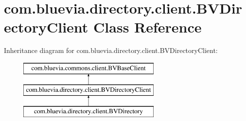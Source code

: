 \hypertarget{classcom_1_1bluevia_1_1directory_1_1client_1_1BVDirectoryClient}{
\section{com.bluevia.directory.client.BVDirectoryClient Class Reference}
\label{classcom_1_1bluevia_1_1directory_1_1client_1_1BVDirectoryClient}
}
Inheritance diagram for com.bluevia.directory.client.BVDirectoryClient:\begin{figure}[H]
\begin{center}
\leavevmode
\includegraphics[height=3.000000cm]{classcom_1_1bluevia_1_1directory_1_1client_1_1BVDirectoryClient}
\end{center}
\end{figure}
